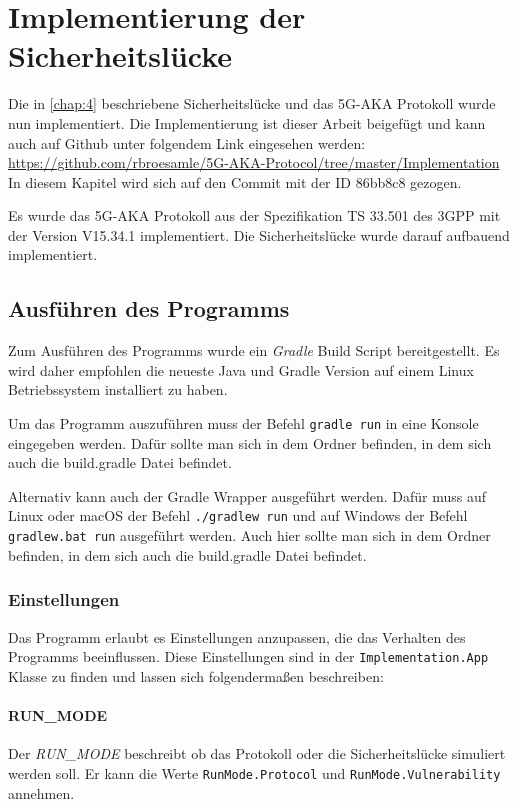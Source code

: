 \chapter{Implementierung der Sicherheitsl\"ucke}
\label{chap:5}

Die in \cref{chap:4} beschriebene Sicherheitslücke und das 5G-AKA Protokoll wurde nun implementiert.
Die Implementierung ist dieser Arbeit beigefügt und kann auch auf Github unter folgendem Link eingesehen werden: \url{https://github.com/rbroesamle/5G-AKA-Protocol/tree/master/Implementation}
In diesem Kapitel wird sich auf den Commit mit der ID 86bb8c8 gezogen.

Es wurde das 5G-AKA Protokoll aus der Spezifikation TS 33.501 des 3GPP mit der Version V15.34.1 implementiert.
Die Sicherheitslücke wurde darauf aufbauend implementiert.


\section{Ausführen des Programms}
Zum Ausführen des Programms wurde ein \textit{Gradle} Build Script bereitgestellt.
Es wird daher empfohlen die neueste Java und Gradle Version auf einem Linux Betriebssystem installiert zu haben.

Um das Programm auszuführen muss der Befehl \lstinline{gradle run} in eine Konsole eingegeben werden.
Dafür sollte man sich in dem Ordner befinden, in dem sich auch die build.gradle Datei befindet.

Alternativ kann auch der Gradle Wrapper ausgeführt werden.
Dafür muss auf Linux oder macOS der Befehl \lstinline{./gradlew run} und auf Windows der Befehl \lstinline{gradlew.bat run} ausgeführt werden.
Auch hier sollte man sich in dem Ordner befinden, in dem sich auch die build.gradle Datei befindet.

\subsection{Einstellungen}

Das Programm erlaubt es Einstellungen anzupassen, die das Verhalten des Programms beeinflussen.
Diese Einstellungen sind in der \lstinline{Implementation.App} Klasse zu finden und lassen sich folgendermaßen beschreiben:

\subsubsection{RUN\_MODE}
Der \textit{RUN\_MODE} beschreibt ob das Protokoll oder die Sicherheitslücke simuliert werden soll.
Er kann die Werte \lstinline{RunMode.Protocol} und \lstinline{RunMode.Vulnerability} annehmen.

